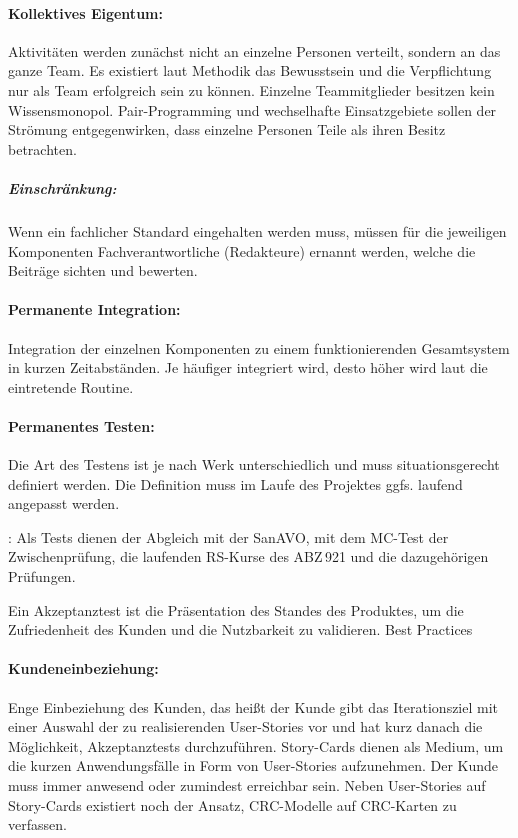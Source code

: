 \documentclass[fontsize=9pt,paper=a4,parskip=half,DIV=11,twocolumn]{scrartcl}
\begin{document}
\paragraph{Kollektives Eigentum:} Aktivitäten werden zunächst nicht an einzelne
Personen verteilt, sondern an das ganze Team. Es existiert laut Methodik das Bewusstsein
und die Verpflichtung nur als Team erfolgreich sein zu können. Einzelne
Teammitglieder besitzen kein Wissensmonopol. Pair-Programming und wechselhafte
Einsatzgebiete sollen der Strömung entgegenwirken, dass einzelne Personen Teile
als ihren Besitz betrachten.
\subparagraph{Einschränkung:} Wenn ein fachlicher Standard eingehalten werden
muss, müssen für die jeweiligen Komponenten Fachverantwortliche (Redakteure)
ernannt werden, welche die Beiträge sichten und bewerten.

\paragraph{Permanente Integration:} Integration der einzelnen Komponenten zu
einem funktionierenden Gesamtsystem in kurzen Zeitabständen. Je häufiger
integriert wird, desto höher wird laut \ADCD{} die eintretende Routine. 

\paragraph{Permanentes Testen:} 
Die Art des Testens ist je nach Werk unterschiedlich und muss situationsgerecht
definiert werden. Die Definition muss im Laufe des Projektes ggfs. laufend
angepasst werden.

\AASS{}: Als Tests dienen der Abgleich mit der SanAVO, mit dem MC-Test der
Zwischenprüfung, die laufenden RS-Kurse des ABZ\,921 und die dazugehörigen
Prüfungen.

Ein Akzeptanztest ist die Präsentation des Standes des
Produktes, um die Zufriedenheit des Kunden und die Nutzbarkeit zu validieren.
\ADCD{} Best Practices

\paragraph{Kundeneinbeziehung:} Enge Einbeziehung des Kunden, das heißt der
Kunde gibt das Iterationsziel mit einer Auswahl der zu realisierenden User-Stories vor und hat
kurz danach die Möglichkeit, Akzeptanztests durchzuführen. Story-Cards dienen als
Medium, um die kurzen Anwendungsfälle in Form von User-Stories aufzunehmen. Der
Kunde muss immer anwesend oder zumindest erreichbar sein. Neben User-Stories auf
Story-Cards existiert noch der Ansatz, CRC-Modelle auf CRC-Karten zu verfassen.
\end{document}
